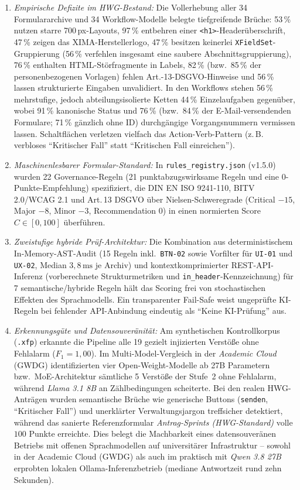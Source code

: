 \begin{enumerate}
    \item[\textbf{FQ1:}] \textit{Empirische Defizite im HWG-Bestand:} Die Vollerhebung aller 34 Formulararchive und 34 Workflow-Modelle belegte tiefgreifende Brüche: 53\,\% nutzen starre 700\,px-Layouts, 97\,\% entbehren einer \texttt{<h1>}-Headerüberschrift, 47\,\% zeigen das XIMA-Herstellerlogo, 47\,\% besitzen keinerlei \texttt{XFieldSet}-Gruppierung (56\,\% verfehlen insgesamt eine saubere Abschnittsgruppierung), 76\,\% enthalten HTML-Störfragmente in Labels, 82\,\% (bzw.\ 85\,\% der personenbezogenen Vorlagen) fehlen Art.-13-DSGVO-Hinweise und 56\,\% lassen strukturierte Eingaben unvalidiert. In den Workflows stehen 56\,\% mehrstufige, jedoch abteilungsisolierte Ketten 44\,\% Einzelaufgaben gegenüber, wobei 91\,\% kanonische Status und 76\,\% (bzw.\ 84\,\% der E-Mail-versendenden Formulare; 71\,\% gänzlich ohne ID) durchgängige Vorgangsnummern vermissen lassen. Schaltflächen verletzen vielfach das Action-Verb-Pattern (z.\,B. verbloses \enquote{Kritischer Fall} statt \enquote{Kritischen Fall einreichen}).
    \item[\textbf{FQ2:}] \textit{Maschinenlesbarer Formular-Standard:} In \texttt{rules\_registry.json} (v1.5.0) wurden 22 Governance-Regeln (21 punktabzugswirksame Regeln und eine 0-Punkte-Empfehlung) spezifiziert, die DIN EN ISO 9241-110, BITV 2.0/WCAG 2.1 und Art.\,13 DSGVO über Nielsen-Schweregrade (Critical $-15$, Major $-8$, Minor $-3$, Recommendation $0$) in einen normierten Score $C \in [0, 100]$ überführen.
    \item[\textbf{FQ3:}] \textit{Zweistufige hybride Prüf-Architektur:} Die Kombination aus deterministischem In-Memory-AST-Audit (15 Regeln inkl.\ \texttt{BTN-02} sowie Vorfilter für \texttt{UI-01} und \texttt{UX-02}, Median $3{,}8\,\text{ms}$ je Archiv) und kontextkomprimierter REST-API-Inferenz (vorberechnete Strukturmetriken und \texttt{in\_header}-Kennzeichnung) für 7 semantische/hybride Regeln hält das Scoring frei von stochastischen Effekten des Sprachmodells. Ein transparenter Fail-Safe weist ungeprüfte KI-Regeln bei fehlender API-Anbindung eindeutig als \enquote{Keine KI-Prüfung} aus.
    \item[\textbf{FQ4:}] \textit{Erkennungsgüte und Datensouveränität:} Am synthetischen Kontrollkorpus (\texttt{.xfp}) erkannte die Pipeline alle 19 gezielt injizierten Verstöße ohne Fehlalarm ($F_1 = 1{,}00$). Im Multi-Model-Vergleich in der \textit{Academic Cloud} (GWDG) identifizierten vier Open-Weight-Modelle ab 27B Parametern bzw.\ MoE-Architektur sämtliche 5 Verstöße der Stufe~2 ohne Fehlalarm, während \textit{Llama 3.1 8B} an Zählbedingungen scheiterte. Bei den realen HWG-Anträgen wurden semantische Brüche wie generische Buttons (\texttt{senden}, \enquote{Kritischer Fall}) und unerklärter Verwaltungsjargon treffsicher detektiert, während das sanierte Referenzformular \textit{Antrag-Sprints (HWG-Standard)} volle $100$ Punkte erreichte. Dies belegt die Machbarkeit eines datensouveränen Betriebs mit offenen Sprachmodellen auf universitärer Infrastruktur -- sowohl in der Academic Cloud (GWDG) als auch im praktisch mit \textit{Qwen 3.8 27B} erprobten lokalen Ollama-Inferenzbetrieb (mediane Antwortzeit rund zehn Sekunden).

\end{enumerate}
